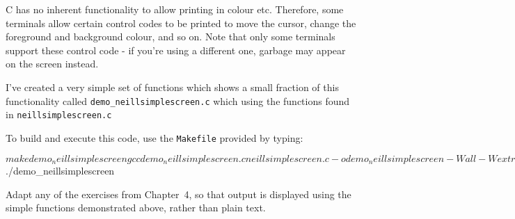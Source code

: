\label{sec:ansi}
C has no inherent functionality to allow printing in colour etc.
Therefore, some terminals allow certain control codes to be printed
to move the cursor, change the foreground and background colour, and
so on.
Note that only some terminals support these control code - if you're
using a different one, garbage may appear on the screen instead.

I've created a very simple set of functions which shows a small
fraction of this functionality called \verb^demo_neillsimplescreen.c^
which using the functions found in \verb^neillsimplescreen.c^

To build and execute this code, use the \verb^Makefile^ provided by typing:
\begin{terminaloutput}
$ make demo_neillsimplescreen
gcc demo_neillsimplescreen.c neillsimplescreen.c
-o demo_neillsimplescreen -Wall -Wextra -pedantic 
-std=c99 -Wvla -g3 -fsanitize=undefined -fsanitize=address -lm
$ ./demo_neillsimplescreen 
\end{terminaloutput}

\begin{exercise}
Adapt any of the exercises from Chapter~4, so that output is displayed
using the simple functions demonstrated above, rather than plain text.
\end{exercise}
